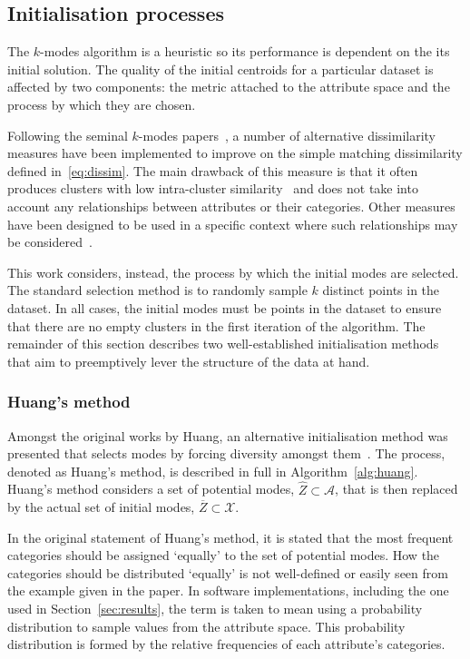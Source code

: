 


\subsection{Initialisation processes}\label{subsec:inits}

The \(k\)-modes algorithm is a heuristic so its performance is dependent on the
its initial solution. The quality of the initial centroids for a particular
dataset is affected by two components: the metric attached to the attribute
space and the process by which they are chosen.

Following the seminal \(k\)-modes papers~\cite{Huang1997a,Huang1997b,Huang1998},
a number of alternative dissimilarity measures have been implemented to improve
on the simple matching dissimilarity defined in~\eqref{eq:dissim}. The main
drawback of this measure is that it often produces clusters with low
intra-cluster similarity~\cite{Ng2007} and does not take into account any
relationships between attributes or their categories. Other measures have been
designed to be used in a specific context where such relationships may be
considered~\cite{Cao2012,Yu2018,Zhou2016}.

This work considers, instead, the process by which the initial modes are
selected. The standard selection method is to randomly sample \(k\) distinct
points in the dataset. In all cases, the initial modes must be points in the
dataset to ensure that there are no empty clusters in the first iteration of the
algorithm. The remainder of this section describes two well-established
initialisation methods that aim to preemptively lever the structure of the data
at hand.

\subsubsection{Huang's method}\label{subsec:huang}

Amongst the original works by Huang, an alternative initialisation method was
presented that selects modes by forcing diversity amongst them~\cite{Huang1998}.
The process, denoted as Huang's method, is described in full in
Algorithm~\ref{alg:huang}. Huang's method considers a set of potential modes,
\(\widehat Z \subset \mathcal A\), that is then replaced by the actual set of
initial modes, \(\overline Z \subset \mathcal X\).

In the original statement of Huang's method, it is stated that the most
frequent categories should be assigned `equally' to the set of potential modes.
How the categories should be distributed `equally' is not well-defined or easily
seen from the example given in the paper. In software implementations, including
the one used in Section~\ref{sec:results}, the term is taken to mean using a
probability distribution to sample values from the attribute space. This
probability distribution is formed by the relative frequencies of each
attribute's categories.

